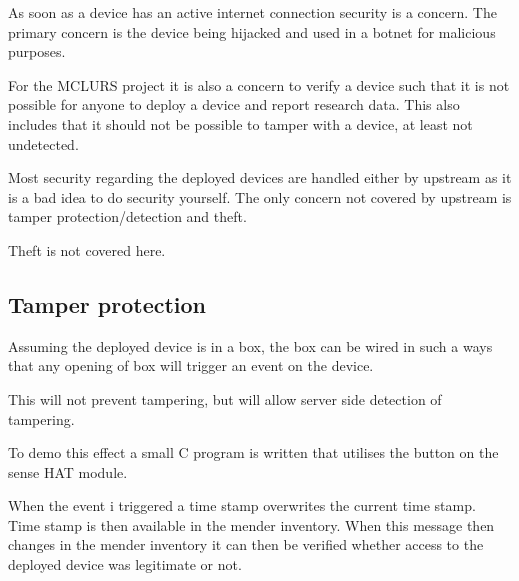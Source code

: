 \documentclass[../../main.tex]{subfiles}
\begin{document}
As soon as a device has an active internet connection security is a concern.
The primary concern is the device being hijacked and used in a botnet for malicious 
purposes.

For the MCLURS project it is also a concern to verify a device such that it is not possible for
anyone to deploy a device and report research data. This also includes that it should not be possible
to tamper with a device, at least not undetected.

Most security regarding the deployed devices are handled either by upstream as it is a bad idea to
do security yourself.
The only concern not covered by upstream is tamper protection/detection and theft.

Theft is not covered here.


%
%
%


\subsection{Tamper protection}%
\label{sub:tamper_protection}

Assuming the deployed device is in a box, the box can be wired in such a ways that any opening of
box will trigger an event on the device.

This will not prevent tampering, but will allow server side detection of tampering.

To demo this effect a small C program is written that utilises the button on the sense HAT
module\cite{sense-hat}.


When the event i triggered a time stamp overwrites the current time stamp.
Time stamp is then available in the mender inventory.
When this message then changes in the mender inventory it can then be verified
whether access to the deployed device was legitimate or not.
\end{document}

